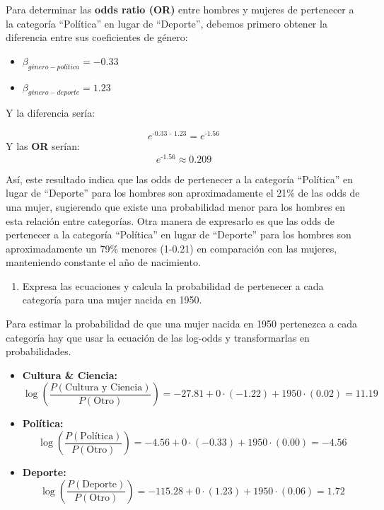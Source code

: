 \documentclass[
  12pt,
  a4paper,
]{article}
\providecommand{\tightlist}{%
  \setlength{\itemsep}{0pt}\setlength{\parskip}{0pt}}
\begin{document}
Para determinar las \textbf{odds ratio (OR)} entre hombres y mujeres de pertenecer a la categoría ``Política'' en lugar de ``Deporte'', debemos primero obtener la diferencia entre sus coeficientes de género:

\begin{itemize}
\item
  \(\beta_{género-política} = -0.33\)
\item
  \(\beta_{género-deporte} = 1.23\)
\end{itemize}

Y la diferencia sería:

\[
e^\text{-0.33 - 1.23}= e^\text{-1.56}
\]
Y las \textbf{OR} serían:
\[
e^\text{-1.56} \approx 0.209
\]

Así, este resultado indica que las odds de pertenecer a la categoría ``Política'' en lugar de ``Deporte'' para los hombres son aproximadamente el 21\% de las odds de una mujer, sugierendo que existe una probabilidad menor para los hombres en esta relación entre categorías. Otra manera de expresarlo es que las odds de pertenecer a la categoría ``Política'' en lugar de ``Deporte'' para los hombres son aproximadamente un 79\% menores (1-0.21) en comparación con las mujeres, manteniendo constante el año de nacimiento.

\begin{enumerate}
\def\labelenumi{\alph{enumi})}
\setcounter{enumi}{3}
\tightlist
\item
  Expresa las ecuaciones y calcula la probabilidad de pertenecer a cada categoría para una mujer nacida en 1950.
\end{enumerate}

Para estimar la probabilidad de que una mujer nacida en 1950 pertenezca a cada categoría hay que usar la ecuación de las log-odds y transformarlas en probabilidades.

\begin{itemize}
\item
  \textbf{Cultura \& Ciencia:}
  \[\log\left(\frac{P(\text{Cultura y Ciencia})}{P(\text{Otro})}\right) = -27.81 + 0 \cdot (-1.22) + 1950 \cdot (0.02) = 11.19
  \]
\item
  \textbf{Política:}
  \[\log\left(\frac{P(\text{Política})}{P(\text{Otro})}\right) = -4.56 + 0 \cdot (-0.33) + 1950 \cdot (0.00) = -4.56
  \]
\item
  \textbf{Deporte:} \[
  \log\left(\frac{P(\text{Deporte})}{P(\text{Otro})}\right) = -115.28 + 0 \cdot (1.23) + 1950 \cdot (0.06) = 1.72
  \]
\end{itemize}
\end{document}
